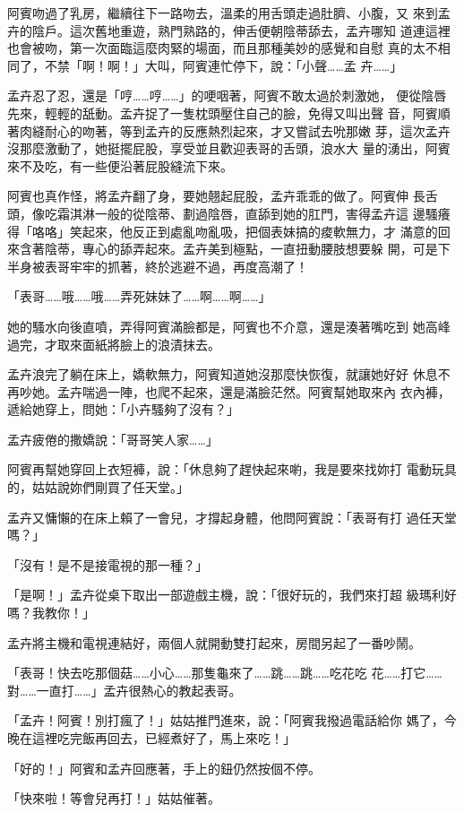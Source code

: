 阿賓吻過了乳房，繼續往下一路吻去，溫柔的用舌頭走過肚臍、小腹，又
來到孟卉的陰戶。這次舊地重遊，熟門熟路的，伸舌便朝陰蒂舔去，孟卉哪知
道連這裡也會被吻，第一次面臨這麼肉緊的場面，而且那種美妙的感覺和自慰
真的太不相同了，不禁「啊！啊！」大叫，阿賓連忙停下，說：「小聲……孟
卉……」

孟卉忍了忍，還是「哼……哼……」的哽咽著，阿賓不敢太過於刺激她，
便從陰唇先來，輕輕的舐動。孟卉捉了一隻枕頭壓住自己的臉，免得又叫出聲
音，阿賓順著肉縫耐心的吻著，等到孟卉的反應熱烈起來，才又嘗試去吮那嫩
芽，這次孟卉沒那麼激動了，她挺擺屁股，享受並且歡迎表哥的舌頭，浪水大
量的湧出，阿賓來不及吃，有一些便沿著屁股縫流下來。

阿賓也真作怪，將孟卉翻了身，要她翹起屁股，孟卉乖乖的做了。阿賓伸
長舌頭，像吃霜淇淋一般的從陰蒂、劃過陰唇，直舔到她的肛門，害得孟卉這
邊騷癢得「咯咯」笑起來，他反正到處亂吻亂吸，把個表妹搞的痠軟無力，才
滿意的回來含著陰蒂，專心的舔弄起來。孟卉美到極點，一直扭動腰肢想要躲
開，可是下半身被表哥牢牢的抓著，終於逃避不過，再度高潮了！

「表哥……哦……哦……弄死妹妹了……啊……啊……」

她的騷水向後直噴，弄得阿賓滿臉都是，阿賓也不介意，還是湊著嘴吃到
她高峰過完，才取來面紙將臉上的浪漬抹去。

孟卉浪完了躺在床上，嬌軟無力，阿賓知道她沒那麼快恢復，就讓她好好
休息不再吵她。孟卉喘過一陣，也爬不起來，還是滿臉茫然。阿賓幫她取來內
衣內褲，遞給她穿上，問她：「小卉騷夠了沒有？」

孟卉疲倦的撒嬌說：「哥哥笑人家……」

阿賓再幫她穿回上衣短褲，說：「休息夠了趕快起來喲，我是要來找妳打
電動玩具的，姑姑說妳們剛買了任天堂。」

孟卉又慵懶的在床上賴了一會兒，才撐起身體，他問阿賓說：「表哥有打
過任天堂嗎？」

「沒有！是不是接電視的那一種？」

「是啊！」孟卉從桌下取出一部遊戲主機，說：「很好玩的，我們來打超
級瑪利好嗎？我教你！」

孟卉將主機和電視連結好，兩個人就開動雙打起來，房間另起了一番吵鬧。

「表哥！快去吃那個菇……小心……那隻龜來了……跳……跳……吃花吃
花……打它……對……一直打……」孟卉很熱心的教起表哥。

「孟卉！阿賓！別打瘋了！」姑姑推門進來，說：「阿賓我撥過電話給你
媽了，今晚在這裡吃完飯再回去，已經煮好了，馬上來吃！」

「好的！」阿賓和孟卉回應著，手上的鈕仍然按個不停。

「快來啦！等會兒再打！」姑姑催著。

